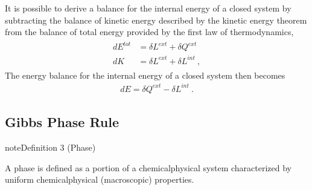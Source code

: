 \documentclass[letterpaper,10pt,english]{jupyterBook}
\begin{document}
\sphinxAtStartPar
It is possible to derive a balance for the internal energy of a closed system by subtracting the balance of kinetic energy described by the kinetic energy theorem from the balance of total energy provided by the first law of thermodynamics,
\begin{equation*}
\begin{split}\begin{aligned}
  d E^{tot} & = \delta L^{ext} + \delta Q^{ext} \\
  d K       & = \delta L^{ext} + \delta L^{int} \ ,
\end{aligned}\end{split}
\end{equation*}
\sphinxAtStartPar
The energy balance for the internal energy of a closed system then becomes
\begin{equation*}
\begin{split}d E = \delta Q^{ext} - \delta L^{int} \ .\end{split}
\end{equation*}

\subsection{Gibbs Phase Rule}
\label{\detokenize{ch/principles-gibbs-phase-rule:gibbs-phase-rule}}\label{\detokenize{ch/principles-gibbs-phase-rule:physics-hs-thermodynamics-foundation-principles-gibbs-phase-rule-gibbs-phase-rule}}\label{ch/principles-gibbs-phase-rule:definition-3}
\begin{sphinxadmonition}{note}{Definition 3 (Phase)}



\sphinxAtStartPar
A phase is defined as a portion of a chemical\sphinxhyphen{}physical system characterized by uniform chemical\sphinxhyphen{}physical (macroscopic) properties.
\end{sphinxadmonition}
\end{document}
